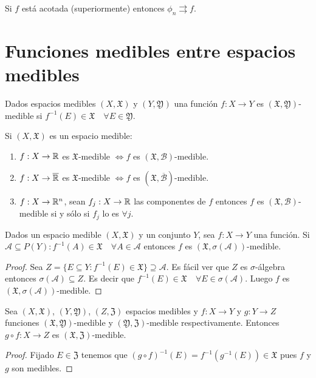 \begin{note}
    Si $f$ está acotada (superiormente) entonces $\phi_n \rightrightarrows f$.
\end{note}

\section{Funciones medibles entre espacios medibles}

\begin{definition}
    Dados espacios medibles $(X, \mathfrak{X})$ y $(Y, \mathfrak{Y})$ una función $f : X \to Y$ es $(\mathfrak{X}, \mathfrak{Y})$-medible si $f^{-1}(E) \in \mathfrak{X} \quad \forall E \in \mathfrak{Y}$.
\end{definition}

\clearpage

\begin{eg}
    Si $(X, \mathfrak{X})$ es un espacio medible:
    \begin{enumerate}
        \item $f: X \to \mathbb{R}$ es $\mathfrak{X}$-medible $\iff f$ es $(\mathfrak{X}, \mathcal{B})$-medible.
        \item $f: X \to \overline{\mathbb{R}}$ es $\mathfrak{X}$-medible $\iff f$ es $(\mathfrak{X}, \overline{\mathcal{B}})$-medible.
        \item $f: X \to \mathbb{R}^n$, sean $f_j : X \to \mathbb{R}$ las componentes de $f$ entonces $f$ es $(\mathfrak{X}, \mathcal{B})$-medible si y sólo si $f_j$ lo es $\forall j$.
    \end{enumerate}
\end{eg}

\begin{prop}
    Dados un espacio medible $(X, \mathfrak{X})$ y un conjunto $Y$, sea $f: X \to Y$ una función.
    Si $\mathcal{A} \subseteq P(Y) : f^{-1}(A) \in \mathfrak{X} \quad \forall A \in \mathcal{A}$ entonces $f$ es $(\mathfrak{X}, \sigma(\mathcal{A}))$-medible.

    \begin{proof}
        Sea $Z = \{ E \subseteq Y : f^{-1}(E) \in \mathfrak{X} \} \supseteq \mathcal{A}$. Es fácil ver que $Z$ es $\sigma$-álgebra entonces $\sigma(\mathcal{A}) \subseteq Z$.
        Es decir que $f^{-1}(E) \in \mathfrak{X} \quad \forall E \in \sigma(\mathcal{A})$. Luego $f$ es $(\mathfrak{X}, \sigma(\mathcal{A}))$-medible.
    \end{proof}
\end{prop}

\begin{prop}
    Sea $(X, \mathfrak{X})$, $(Y, \mathfrak{Y})$, $(Z, \mathfrak{Z})$ espacios medibles y $f: X \to Y$ y $g: Y \to Z$ funciones $(\mathfrak{X}, \mathfrak{Y})$-medible y $(\mathfrak{Y}, \mathfrak{Z})$-medible respectivamente.
    Entonces $g \circ f : X \to Z$ es $(\mathfrak{X}, \mathfrak{Z})$-medible.
    \begin{proof}
        Fijado $E \in \mathfrak{Z}$ tenemos que $(g \circ f)^{-1}(E) = f^{-1}(g^{-1}(E)) \in \mathfrak{X}$ pues $f$ y $g$ son medibles.
    \end{proof}
\end{prop}